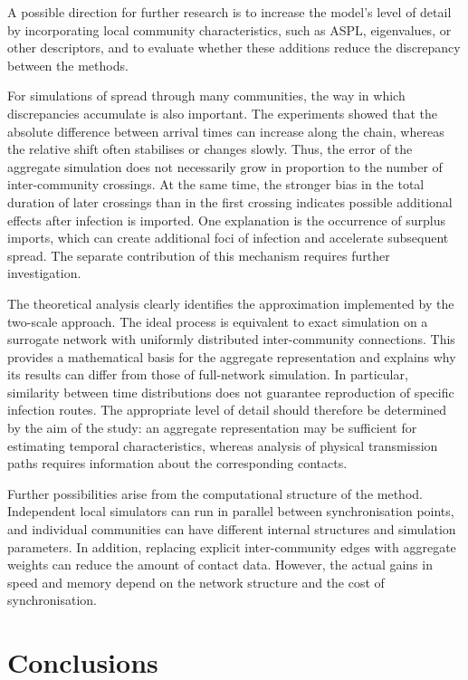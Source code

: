 \documentclass[a4paper,fleqn]{cas-sc}
\begin{document}
A possible direction for further research is to increase the model's level of detail by incorporating local community characteristics, such as ASPL, eigenvalues, or other descriptors, and to evaluate whether these additions reduce the discrepancy between the methods.

For simulations of spread through many communities, the way in which discrepancies accumulate is also important. The experiments showed that the absolute difference between arrival times can increase along the chain, whereas the relative shift often stabilises or changes slowly. Thus, the error of the aggregate simulation does not necessarily grow in proportion to the number of inter-community crossings. At the same time, the stronger bias in the total duration of later crossings than in the first crossing indicates possible additional effects after infection is imported. One explanation is the occurrence of surplus imports, which can create additional foci of infection and accelerate subsequent spread. The separate contribution of this mechanism requires further investigation.

The theoretical analysis clearly identifies the approximation implemented by the two-scale approach. The ideal process is equivalent to exact simulation on a surrogate network with uniformly distributed inter-community connections. This provides a mathematical basis for the aggregate representation and explains why its results can differ from those of full-network simulation. In particular, similarity between time distributions does not guarantee reproduction of specific infection routes. The appropriate level of detail should therefore be determined by the aim of the study: an aggregate representation may be sufficient for estimating temporal characteristics, whereas analysis of physical transmission paths requires information about the corresponding contacts.

Further possibilities arise from the computational structure of the method. Independent local simulators can run in parallel between synchronisation points, and individual communities can have different internal structures and simulation parameters. In addition, replacing explicit inter-community edges with aggregate weights can reduce the amount of contact data. However, the actual gains in speed and memory depend on the network structure and the cost of synchronisation.

\section{Conclusions}
\label{sec:conclusions}
\end{document}

